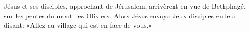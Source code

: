\encetemps Jésus et ses disciples, approchant de Jérusalem,
	arrivèrent en vue de Bethphagé, sur les pentes du mont des Oliviers.
Alors Jésus envoya deux disciples en leur disant:
	«Allez au village qui est en face de vous.»
